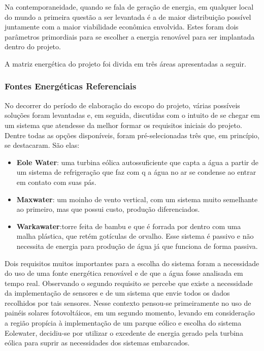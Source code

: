 
Na contemporaneidade, quando se fala de geração de energia, em qualquer local do mundo a primeira questão a ser levantada
é a de maior distribuição possível juntamente com a maior viabilidade econômica envolvida. Estes foram dois parâmetros 
primordiais para se escolher a energia renovável para ser implantada dentro do projeto.

A matriz energética do projeto foi divida em três áreas apresentadas a seguir.

  \subsubsection{Fontes Energéticas Referenciais}
    
    No decorrer do período de elaboração do escopo do projeto, várias possíveis soluções foram levantadas e, em seguida, 
    discutidas com o intuito de se chegar em um sistema que atendesse da melhor formar os requisitos iniciais do projeto.
    Dentre todas as opções disponíveis, foram pré-selecionadas três que, em princípio, se destacaram. São elas:
    
    \begin{itemize}
      \item \textbf{Eole Water}: uma turbina eólica autossuficiente que capta a água a partir de um sistema de refrigeração
	que faz com q a água no ar se condense ao entrar em contato com suas pás.
     
      \item \textbf{Maxwater}: um moinho de vento vertical, com um sistema muito semelhante ao primeiro, mas que possui custo,
	produção diferenciados.
      
      \item \textbf{Warkawater}:torre feita de bambu e que é forrada por dentro com uma malha plástica, que retém gotículas
	de orvalho. Esse sistema é passivo e não necessita de energia para produção de água já que funciona de forma passiva.
    \end{itemize}
  
    Dois requisitos muitos importantes para a escolha do sistema foram a necessidade do uso de uma fonte energética renovável
    e de que a água fosse analisada em tempo real. Observando o segundo requisito se percebe que existe a necessidade da
    implementação de sensores e de um sistema que envie todos os dados recolhidos por tais sensores. Nesse contexto pensou-se 
    primeiramente no uso de painéis solares fotovoltáicos, em um segundo momento, levando em consideração a região propícia à 
    implementação de um parque eólico e escolha do sistema Eolewater, decidiu-se por utilizar o excedente de energia gerado 
    pela turbina eólica para suprir as necessidades dos sistemas embarcados.
  
